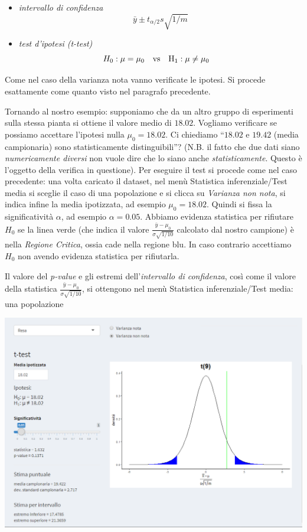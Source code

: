 \documentclass[
  11pt,
]{book}
\begin{document}
\begin{itemize}
\item
  \emph{intervallo di confidenza}
  \[
  \bar{y} \pm t_{\alpha/2}s\sqrt{1/m}
  \]
\item
  \emph{test d'ipotesi (t-test)}
  \[
   H_0: \mu=\mu_0 \quad \rm{vs} \quad H_1: \mu \neq \mu_0 \quad 
  \]
\end{itemize}

Come nel caso della varianza nota vanno verificate le ipotesi. Si procede esattamente come quanto visto nel paragrafo precedente.

Tornando al nostro esempio: supponiamo che da un altro gruppo di esperimenti sulla stessa pianta si ottiene il
valore medio di \(18.02\). Vogliamo verificare se possiamo accettare l'ipotesi nulla \(\mu_0=18.02\). Ci chiediamo ``\(18.02\) e \(19.42\) (media campionaria) sono
statisticamente distinguibili''?
(N.B. il fatto che due dati siano \emph{numericamente diversi} non vuole dire che lo siano anche \emph{statisticamente}. Questo è l'oggetto della verifica in questione).
Per eseguire il test si procede come nel caso precedente: una volta caricato il dataset, nel menù Statistica inferenziale/Test media si sceglie il caso di una popolazione e si clicca su \emph{Varianza non nota}, si indica infine la media ipotizzata, ad esempio \(\mu_0=18.02\). Quindi si fissa la significatività \(\alpha\), ad esempio \(\alpha = 0.05\).
Abbiamo evidenza statistica per rifiutare \(H_0\) se la linea verde (che indica il valore \(\frac{\bar{y}-\mu_0}{\sigma\sqrt{1/10}}\) calcolato dal nostro campione) è nella \emph{Regione Critica}, ossia cade nella regione blu. In caso contrario accettiamo \(H_0\) non avendo evidenza statistica per rifiutarla.

Il valore del \emph{p-value} e gli estremi dell'\emph{intervallo di confidenza}, così come il valore della statistica \(\frac{\bar{y}-\mu_0}{\sigma\sqrt{1/10}}\), si ottengono nel menù Statistica inferenziale/Test media: una popolazione

\begin{center}\includegraphics[width=0.5\linewidth]{Immagini/Inferenziale/t_test} \end{center}
\end{document}

